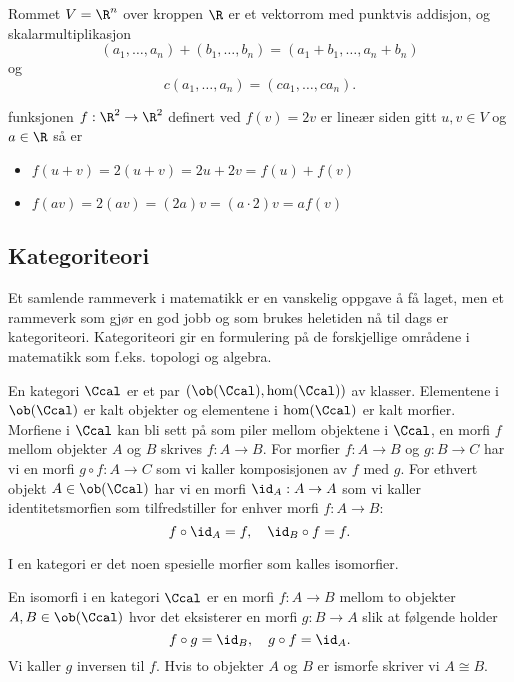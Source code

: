 \begin{example}\label{Ex:label}
    Rommet $V = \R^n$ over kroppen $\R$ er et vektorrom med punktvis addisjon, og skalarmultiplikasjon
    \[(a_1,\dots,a_n)+(b_1,\dots,b_n) = (a_1+b_1,\dots,a_n+b_n)\]
    og
    \[c(a_1,\dots,a_n)=(ca_1,\dots,ca_n).\]
\end{example}

\begin{example}\label{Ex:label}
    funksjonen $f:\R^2\to\R^2$ definert ved $f(v) = 2v$ er lineær siden gitt $u,v\in V$ og $a\in\R$ så er
    \begin{itemize}
        \item $f(u+v) = 2(u+v) = 2u+2v = f(u)+f(v)$
        \item $f(av) = 2(av) = (2a)v = (a\cdot2)v = af(v)$
    \end{itemize}
\end{example}

\subsection{Kategoriteori}\label{Sec:Katgoriteori}
Et samlende rammeverk i matematikk er en vanskelig oppgave å få laget, men et rammeverk som gjør en god jobb og som brukes heletiden nå til dags er kategoriteori. Kategoriteori gir en formulering på de forskjellige områdene i matematikk som f.eks. topologi og algebra.

\begin{definition}\label{Def:Kategori}
    En kategori $\Ccal$ er et par $(\ob(\Ccal),\hom(\Ccal))$ av klasser. Elementene i $\ob(\Ccal)$ er kalt objekter og elementene i $\hom(\Ccal)$ er kalt morfier. Morfiene i $\Ccal$ kan bli sett på som piler mellom objektene i $\Ccal$, en morfi $f$ mellom objekter $A$ og $B$ skrives $f:A\to B$.
    For morfier $f: A\to B$ og $g: B\to C$ har vi en morfi $g\circ f: A\to C$ som vi kaller komposisjonen av $f$ med $g$.
    For ethvert objekt $A\in\ob(\Ccal)$ har vi en morfi $\id_A: A\to A$ som vi kaller identitetsmorfien som tilfredstiller for enhver morfi $f:A\to B$:
    \[f\circ\id_A = f,\quad \id_B\circ f = f.\]
\end{definition}

I en kategori er det noen spesielle morfier som kalles isomorfier.
\begin{definition}\label{Def:Iso}
    En isomorfi i en kategori $\Ccal$ er en morfi $f:A\to B$ mellom to objekter $A,B\in\ob(\Ccal)$ hvor det eksisterer en morfi $g:B\to A$ slik at følgende holder
    \[f\circ g = \id_B,\quad g\circ f = \id_A.\]
    Vi kaller $g$ inversen til $f$. Hvis to objekter $A$ og $B$ er ismorfe skriver vi $A\cong B$.
\end{definition}

